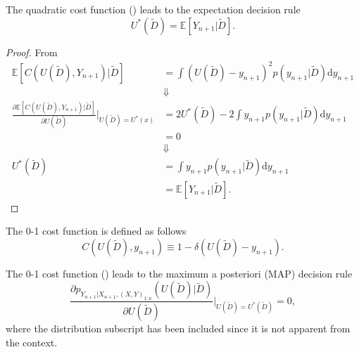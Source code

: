 \begin{theorem}
	\label{theorem:expectation_decision_rule}
	The quadratic cost function () leads to the expectation decision rule
	\begin{equation}
		U^*(\tilde{D}) = \mathbb{E}[Y_{n+1}|\tilde{D}].
	\end{equation}
\end{theorem}

\begin{proof}
	From 
	\begin{equation}
		\begin{split}
			\mathbb{E}[C(U(\tilde{D}), Y_{n+1})|\tilde{D}] &= \int (U(\tilde{D})-y_{n+1})^2 p(y_{n+1}|\tilde{D}) \mathrm{d}y_{n+1}\\
			&\Downarrow\\
			\frac{\partial \mathbb{E}[C(U(\tilde{D}), Y_{n+1})|\tilde{D}]}{\partial U(\tilde{D})}\bigg|_{U(\tilde{D})=U^*(x)} &= 2U^*(\tilde{D})-2\int y_{n+1}p(y_{n+1}|\tilde{D}) \mathrm{d}y_{n+1}\\
			&=0\\
			&\Downarrow\\
			U^*(\tilde{D})& = \int y_{n+1}p(y_{n+1}|\tilde{D})\mathrm{d}y_{n+1}\\
			&= \mathbb{E}[Y_{n+1}|\tilde{D}].
		\end{split}
	\end{equation}
\end{proof}

\begin{definition}
	\label{def:0_1_cost_function}
	The 0-1 cost function is defined as follows
	\begin{equation}
		C(U(\tilde{D}),y_{n+1}) \equiv 1-\delta(U(\tilde{D})-y_{n+1}).
	\end{equation}
\end{definition}

\begin{theorem}
	\label{theorem:MAP}
	The 0-1 cost function () leads to the maximum a posteriori (MAP) decision rule
	\begin{equation}
		\frac{\partial p_{Y_{n+1}|X_{n+1},(X,Y)_{1\colon n}}(U(\tilde{D})|\tilde{D})}{\partial U(\tilde{D})}\bigg|_{U(\tilde{D})=U^*(\tilde{D})}=0,
	\end{equation}
	where the distribution subscript has been included since it is not apparent from the context.
\end{theorem}


